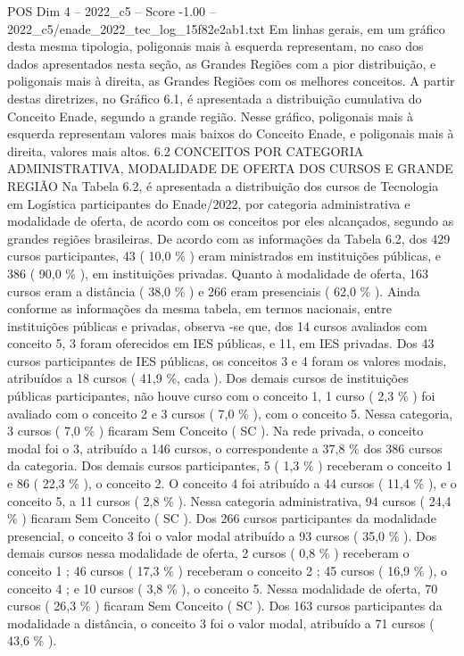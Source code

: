 \begin{textsample}{POS Dim 4 – 2022\_c5 – Score -1.00 – 2022\_c5/enade\_2022\_tec\_log\_15f82e2ab1.txt}
Em linhas gerais, em um gráfico desta mesma tipologia, poligonais mais à esquerda representam, no caso dos dados apresentados nesta seção, as Grandes Regiões com a pior distribuição, e poligonais mais à direita, as Grandes Regiões com os melhores conceitos.
A partir destas diretrizes, no Gráfico 6.1, é apresentada a distribuição cumulativa do Conceito Enade, segundo a grande região.
Nesse gráfico, poligonais mais à esquerda representam valores mais baixos do Conceito Enade, e poligonais mais à direita, valores mais altos. 6.2 CONCEITOS POR CATEGORIA ADMINISTRATIVA, MODALIDADE DE OFERTA DOS CURSOS E GRANDE REGIÃO Na Tabela 6.2, é apresentada a distribuição dos cursos de Tecnologia em Logística participantes do Enade/2022, por categoria administrativa e modalidade de oferta, de acordo com os conceitos por eles alcançados, segundo as grandes regiões brasileiras.
De acordo com as informações da Tabela 6.2, dos 429 cursos participantes, 43 ( 10,0 \% ) eram ministrados em instituições públicas, e 386 ( 90,0 \% ), em instituições privadas.
Quanto à modalidade de oferta, 163 cursos eram a distância ( 38,0 \% ) e 266 eram presenciais ( 62,0 \% ).
Ainda conforme as informações da mesma tabela, em termos nacionais, entre instituições públicas e privadas, observa -se que, dos 14 cursos avaliados com conceito 5, 3 foram oferecidos em IES públicas, e 11, em IES privadas.
Dos 43 cursos participantes de IES públicas, os conceitos 3 e 4 foram os valores modais, atribuídos a 18 cursos ( 41,9 \%, cada ).
Dos demais cursos de instituições públicas participantes, não houve curso com o conceito 1, 1 curso ( 2,3 \% ) foi avaliado com o conceito 2 e 3 cursos ( 7,0 \% ), com o conceito 5.
Nessa categoria, 3 cursos ( 7,0 \% ) ficaram Sem Conceito ( SC ).
Na rede privada, o conceito modal foi o 3, atribuído a 146 cursos, o correspondente a 37,8 \% dos 386 cursos da categoria.
Dos demais cursos participantes, 5 ( 1,3 \% ) receberam o conceito 1 e 86 ( 22,3 \% ), o conceito 2.
O conceito 4 foi atribuído a 44 cursos ( 11,4 \% ), e o conceito 5, a 11 cursos ( 2,8 \% ).
Nessa categoria administrativa, 94 cursos ( 24,4 \% ) ficaram Sem Conceito ( SC ).
Dos 266 cursos participantes da modalidade presencial, o conceito 3 foi o valor modal atribuído a 93 cursos ( 35,0 \% ).
Dos demais cursos nessa modalidade de oferta, 2 cursos ( 0,8 \% ) receberam o conceito 1 ; 46 cursos ( 17,3 \% ) receberam o conceito 2 ; 45 cursos ( 16,9 \% ), o conceito 4 ; e 10 cursos ( 3,8 \% ), o conceito 5.
Nessa modalidade de oferta, 70 cursos ( 26,3 \% ) ficaram Sem Conceito ( SC ).
Dos 163 cursos participantes da modalidade a distância, o conceito 3 foi o valor modal, atribuído a 71 cursos ( 43,6 \% ).

\end{textsample}
